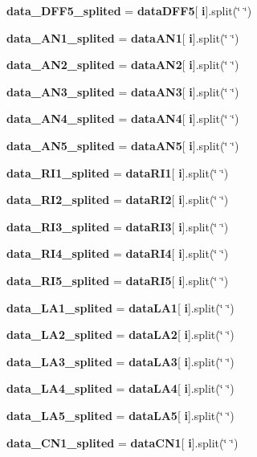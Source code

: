 \begin{DoxyCompactItemize}
\item 
\textbf{ data\+\_\+\+D\+F\+F5\+\_\+splited} = \textbf{ data\+D\+F\+F5}[\textbf{ i}].split(\char`\"{} \char`\"{})
\item 
\textbf{ data\+\_\+\+A\+N1\+\_\+splited} = \textbf{ data\+A\+N1}[\textbf{ i}].split(\char`\"{} \char`\"{})
\item 
\textbf{ data\+\_\+\+A\+N2\+\_\+splited} = \textbf{ data\+A\+N2}[\textbf{ i}].split(\char`\"{} \char`\"{})
\item 
\textbf{ data\+\_\+\+A\+N3\+\_\+splited} = \textbf{ data\+A\+N3}[\textbf{ i}].split(\char`\"{} \char`\"{})
\item 
\textbf{ data\+\_\+\+A\+N4\+\_\+splited} = \textbf{ data\+A\+N4}[\textbf{ i}].split(\char`\"{} \char`\"{})
\item 
\textbf{ data\+\_\+\+A\+N5\+\_\+splited} = \textbf{ data\+A\+N5}[\textbf{ i}].split(\char`\"{} \char`\"{})
\item 
\textbf{ data\+\_\+\+R\+I1\+\_\+splited} = \textbf{ data\+R\+I1}[\textbf{ i}].split(\char`\"{} \char`\"{})
\item 
\textbf{ data\+\_\+\+R\+I2\+\_\+splited} = \textbf{ data\+R\+I2}[\textbf{ i}].split(\char`\"{} \char`\"{})
\item 
\textbf{ data\+\_\+\+R\+I3\+\_\+splited} = \textbf{ data\+R\+I3}[\textbf{ i}].split(\char`\"{} \char`\"{})
\item 
\textbf{ data\+\_\+\+R\+I4\+\_\+splited} = \textbf{ data\+R\+I4}[\textbf{ i}].split(\char`\"{} \char`\"{})
\item 
\textbf{ data\+\_\+\+R\+I5\+\_\+splited} = \textbf{ data\+R\+I5}[\textbf{ i}].split(\char`\"{} \char`\"{})
\item 
\textbf{ data\+\_\+\+L\+A1\+\_\+splited} = \textbf{ data\+L\+A1}[\textbf{ i}].split(\char`\"{} \char`\"{})
\item 
\textbf{ data\+\_\+\+L\+A2\+\_\+splited} = \textbf{ data\+L\+A2}[\textbf{ i}].split(\char`\"{} \char`\"{})
\item 
\textbf{ data\+\_\+\+L\+A3\+\_\+splited} = \textbf{ data\+L\+A3}[\textbf{ i}].split(\char`\"{} \char`\"{})
\item 
\textbf{ data\+\_\+\+L\+A4\+\_\+splited} = \textbf{ data\+L\+A4}[\textbf{ i}].split(\char`\"{} \char`\"{})
\item 
\textbf{ data\+\_\+\+L\+A5\+\_\+splited} = \textbf{ data\+L\+A5}[\textbf{ i}].split(\char`\"{} \char`\"{})
\item 
\textbf{ data\+\_\+\+C\+N1\+\_\+splited} = \textbf{ data\+C\+N1}[\textbf{ i}].split(\char`\"{} \char`\"{})

\end{DoxyCompactItemize}
